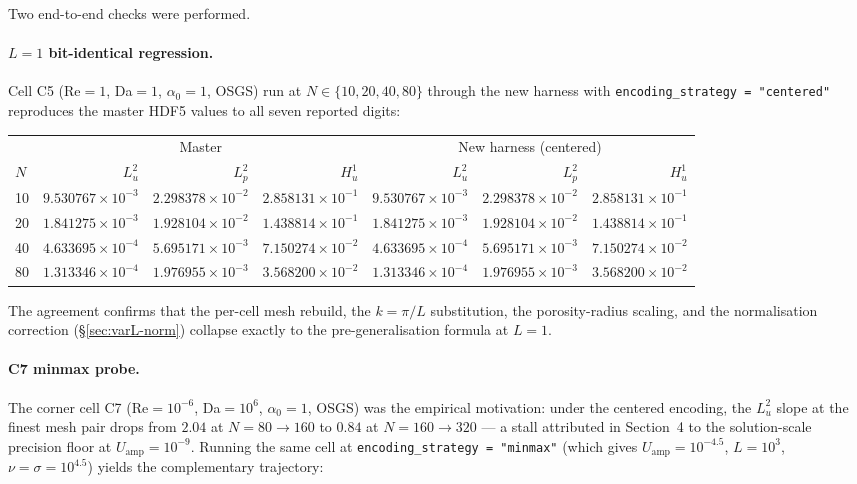 \documentclass[11pt]{article}
\newcommand{\code}[1]{\texttt{#1}}
\begin{document}
Two end-to-end checks were performed.

\paragraph{$L=1$ bit-identical regression.} Cell C5 (Re$=1$, Da$=1$,
$\alpha_0=1$, OSGS) run at $N \in \{10, 20, 40, 80\}$ through the new
harness with \code{encoding\_strategy = "centered"} reproduces the
master HDF5 values to all seven reported digits:

\begin{center}
\begin{tabular}{lrrr|rrr}
  \toprule
  & \multicolumn{3}{c|}{Master} & \multicolumn{3}{c}{New harness (centered)} \\
  $N$ & $L^2_u$ & $L^2_p$ & $H^1_u$ & $L^2_u$ & $L^2_p$ & $H^1_u$ \\
  \midrule
  10 & $9.530767\!\times\!10^{-3}$ & $2.298378\!\times\!10^{-2}$ & $2.858131\!\times\!10^{-1}$
     & $9.530767\!\times\!10^{-3}$ & $2.298378\!\times\!10^{-2}$ & $2.858131\!\times\!10^{-1}$ \\
  20 & $1.841275\!\times\!10^{-3}$ & $1.928104\!\times\!10^{-2}$ & $1.438814\!\times\!10^{-1}$
     & $1.841275\!\times\!10^{-3}$ & $1.928104\!\times\!10^{-2}$ & $1.438814\!\times\!10^{-1}$ \\
  40 & $4.633695\!\times\!10^{-4}$ & $5.695171\!\times\!10^{-3}$ & $7.150274\!\times\!10^{-2}$
     & $4.633695\!\times\!10^{-4}$ & $5.695171\!\times\!10^{-3}$ & $7.150274\!\times\!10^{-2}$ \\
  80 & $1.313346\!\times\!10^{-4}$ & $1.976955\!\times\!10^{-3}$ & $3.568200\!\times\!10^{-2}$
     & $1.313346\!\times\!10^{-4}$ & $1.976955\!\times\!10^{-3}$ & $3.568200\!\times\!10^{-2}$ \\
  \bottomrule
\end{tabular}
\end{center}

\noindent The agreement confirms that the per-cell mesh rebuild, the
$k = \pi/L$ substitution, the porosity-radius scaling, and the
normalisation correction (§\ref{sec:varL-norm}) collapse exactly to the
pre-generalisation formula at $L = 1$.

\paragraph{C7 minmax probe.} The corner cell C7 (Re$=10^{-6}$,
Da$=10^{6}$, $\alpha_0=1$, OSGS) was the empirical motivation: under the
centered encoding, the $L^2_u$ slope at the finest mesh pair drops from
$2.04$ at $N=80 \to 160$ to $0.84$ at $N=160 \to 320$ — a stall
attributed in Section~4 to the solution-scale precision floor at
$U_{\mathrm{amp}} = 10^{-9}$. Running the same cell at
\code{encoding\_strategy = "minmax"} (which gives $U_{\mathrm{amp}} =
10^{-4.5}$, $L = 10^3$, $\nu = \sigma = 10^{4.5}$) yields the
complementary trajectory:
\end{document}
